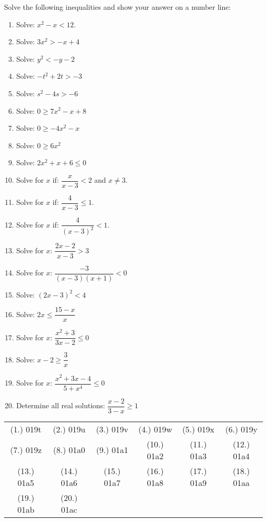 \begin{eocexercises}{}
Solve the following inequalities and show your answer on a number line:
\begin{enumerate}
\item{Solve: $x^2-x<12$.}
\item{Solve: $3x^2 > -x + 4$}
\item{Solve: $y^2 < -y - 2$}
\item{Solve: $-t^2 + 2t > -3$}
\item{Solve: $s^2 - 4s > -6$}
\item{Solve: $0\geq7x^2-x+8$}
\item{Solve: $0\geq -4x^2-x$}
\item{Solve: $0\geq6x^2$}
\item{Solve: $2x^2 + x + 6\leq0$}
\item{Solve for $x$ if: $\dfrac{x}{x-3} < 2$ and $x \neq 3$.}
\item{Solve for $x$ if: $\dfrac{4}{x-3} \leq 1$.}
\item{Solve for $x$ if: $\dfrac{4}{(x-3)^2} < 1$.}
\item{Solve for $x$: $\dfrac{2x-2}{x-3} > 3$}
\item{Solve for $x$: $\dfrac{-3}{(x-3)(x+1)} <0$}
\item{Solve: $(2x-3)^2 < 4$}
\item{Solve: $2x \leq \dfrac{15-x}{x}$}
\item{Solve for $x$: \quad $\dfrac{x^2 + 3}{3x - 2} \leq 0$}
\item{Solve: $x-2 \geq \dfrac{3}{x}$}
\item{Solve for $x$: $\dfrac{x^2+3x-4}{5+x^4} \leq 0$}
\item{Determine all real solutions: $\dfrac{x-2}{3-x} \geq 1$}
\end{enumerate}



\par \practiceinfo
\par \begin{tabular}[h]{cccccc}
(1.)	019t	&
(2.)	019u	&
(3.)	019v	&
(4.)	019w	&
(5.)	019x	&
(6.)	019y	\\ %
(7.)	019z	&
(8.)	01a0	&
(9.)	01a1	&
(10.)	01a2	&
(11.)	01a3	&
(12.)	01a4	\\ %
(13.)	01a5	&
(14.)	01a6	&
(15.)	01a7	&
(16.)	01a8	&
(17.)	01a9	&
(18.)	01aa	\\ %
(19.)	01ab	&
(20.)	01ac	&
\end{tabular}
\end{eocexercises}




